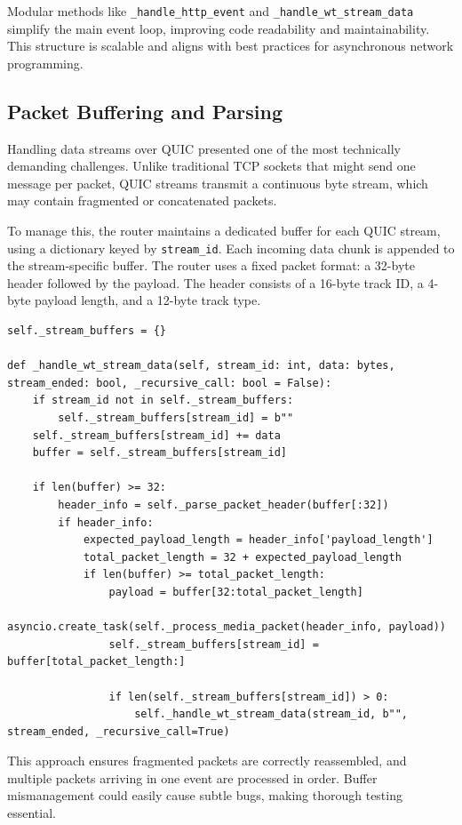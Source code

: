 Modular methods like \texttt{\_handle\_http\_event} and \texttt{\_handle\_wt\_stream\_data} simplify the main event loop, improving code readability and maintainability. This structure is scalable and aligns with best practices for asynchronous network programming.

\subsection{Packet Buffering and Parsing}

Handling data streams over QUIC presented one of the most technically demanding challenges. Unlike traditional TCP sockets that might send one message per packet, QUIC streams transmit a continuous byte stream, which may contain fragmented or concatenated packets.

To manage this, the router maintains a dedicated buffer for each QUIC stream, using a dictionary keyed by \texttt{stream\_id}. Each incoming data chunk is appended to the stream-specific buffer. The router uses a fixed packet format: a 32-byte header followed by the payload. The header consists of a 16-byte track ID, a 4-byte payload length, and a 12-byte track type.

\begin{lstlisting}
self._stream_buffers = {}

def _handle_wt_stream_data(self, stream_id: int, data: bytes, stream_ended: bool, _recursive_call: bool = False):
    if stream_id not in self._stream_buffers:
        self._stream_buffers[stream_id] = b""
    self._stream_buffers[stream_id] += data
    buffer = self._stream_buffers[stream_id]

    if len(buffer) >= 32:
        header_info = self._parse_packet_header(buffer[:32])
        if header_info:
            expected_payload_length = header_info['payload_length']
            total_packet_length = 32 + expected_payload_length
            if len(buffer) >= total_packet_length:
                payload = buffer[32:total_packet_length]
                asyncio.create_task(self._process_media_packet(header_info, payload))
                self._stream_buffers[stream_id] = buffer[total_packet_length:]

                if len(self._stream_buffers[stream_id]) > 0:
                    self._handle_wt_stream_data(stream_id, b"", stream_ended, _recursive_call=True)
\end{lstlisting}

This approach ensures fragmented packets are correctly reassembled, and multiple packets arriving in one event are processed in order. Buffer mismanagement could easily cause subtle bugs, making thorough testing essential.

